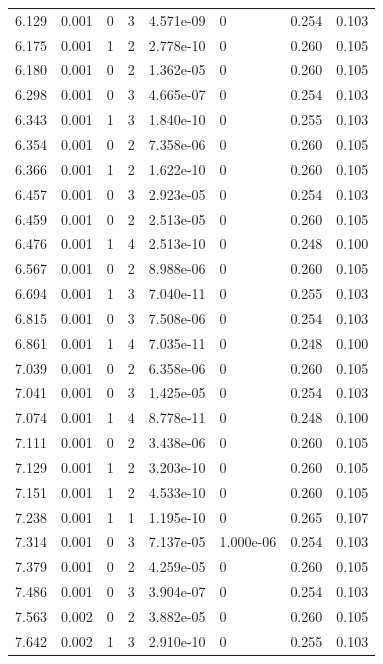 \documentclass[preview]{standalone}
\begin{document}
{{{\begin{tabular}{L{1.2cm}C{1.2cm} C{0.3cm}C{0.5cm} C{1.4cm}C{1.4cm} C{1.4cm}C{1.4cm}}
  6.129  &  0.001  & 0     &  3 &  4.571e-09  & 0  & 0.254 &  0.103   \\ 
  6.175  &  0.001  & 1     &  2 &  2.778e-10  & 0  & 0.260 &  0.105   \\ 
  6.180  &  0.001  & 0     &  2 &  1.362e-05  & 0  & 0.260 &  0.105   \\ 
  6.298  &  0.001  & 0     &  3 &  4.665e-07  & 0  & 0.254 &  0.103   \\ 
  6.343  &  0.001  & 1     &  3 &  1.840e-10  & 0  & 0.255 &  0.103   \\ 
  6.354  &  0.001  & 0     &  2 &  7.358e-06  & 0  & 0.260 &  0.105   \\ 
  6.366  &  0.001  & 1     &  2 &  1.622e-10  & 0  & 0.260 &  0.105   \\ 
  6.457  &  0.001  & 0     &  3 &  2.923e-05  & 0  & 0.254 &  0.103   \\ 
  6.459  &  0.001  & 0     &  2 &  2.513e-05  & 0  & 0.260 &  0.105   \\ 
  6.476  &  0.001  & 1     &  4 &  2.513e-10  & 0  & 0.248 &  0.100   \\ 
  6.567  &  0.001  & 0     &  2 &  8.988e-06  & 0  & 0.260 &  0.105   \\ 
  6.694  &  0.001  & 1     &  3 &  7.040e-11  & 0  & 0.255 &  0.103   \\ 
  6.815  &  0.001  & 0     &  3 &  7.508e-06  & 0  & 0.254 &  0.103   \\ 
  6.861  &  0.001  & 1     &  4 &  7.035e-11  & 0  & 0.248 &  0.100   \\ 
  7.039  &  0.001  & 0     &  2 &  6.358e-06  & 0  & 0.260 &  0.105   \\ 
  7.041  &  0.001  & 0     &  3 &  1.425e-05  & 0  & 0.254 &  0.103   \\ 
  7.074  &  0.001  & 1     &  4 &  8.778e-11  & 0  & 0.248 &  0.100   \\ 
  7.111  &  0.001  & 0     &  2 &  3.438e-06  & 0  & 0.260 &  0.105   \\ 
  7.129  &  0.001  & 1     &  2 &  3.203e-10  & 0  & 0.260 &  0.105   \\ 
  7.151  &  0.001  & 1     &  2 &  4.533e-10  & 0  & 0.260 &  0.105   \\ 
  7.238  &  0.001  & 1     &  1 &  1.195e-10  & 0  & 0.265 &  0.107   \\ 
  7.314  &  0.001  & 0     &  3 &  7.137e-05  & 1.000e-06  & 0.254 &  0.103   \\ 
  7.379  &  0.001  & 0     &  2 &  4.259e-05  & 0  & 0.260 &  0.105   \\ 
  7.486  &  0.001  & 0     &  3 &  3.904e-07  & 0  & 0.254 &  0.103   \\ 
  7.563  &  0.002  & 0     &  2 &  3.882e-05  & 0  & 0.260 &  0.105   \\ 
  7.642  &  0.002  & 1     &  3 &  2.910e-10  & 0  & 0.255 &  0.103   \\ 
\hline 
\end{tabular} 

}}}
\end{document}
